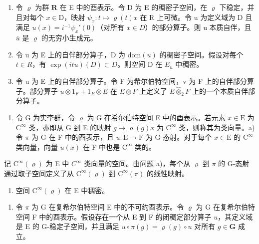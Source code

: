 \begin{enumerate}
\def\labelenumi{\alph{enumi})}
\item
  令 \(\varrho\) 为群 \(\mathbf{R}\) 在 E 中的酉表示。令 D 为 E 的稠密子空间，在 \(\varrho\) 下稳定，并且对每个 \(x\in\mathrm{D}\)，映射 \(\psi_{x}:t\mapsto\varrho(t)x\) 在 R 上可微。令 u 为定义域为 D 且满足 \(u(x) = i^{-1}\psi_x'(0)\)（对所有 \(x \in D\)）的部分算子。则 u 本质自伴，且 \(\overline{u}\) 是 \(\varrho\) 的无穷小生成元。
\item
  令 u 为 E 上的自伴部分算子，D 为 \(\text{dom}(u)\) 的稠密子空间。假设对每个 \(t \in R\)，有 \(\exp(itu)(D) \subset D\)。则空间 D 在 \(E_{u}\) 中稠密。
\item
  令 u 为 E 上的自伴部分算子。令 F 为希尔伯特空间，v 为 F 上的自伴部分算子。部分算子 \(u \otimes 1_{F} + 1_{E} \otimes E\) 在 \(E \otimes F\) 上定义了 \(E \widehat{\otimes}_{2} F\) 上的一个本质自伴部分算子。
\end{enumerate}

\begin{enumerate}
\def\labelenumi{\arabic{enumi})}
\setcounter{enumi}{11}
\tightlist
\item
  令 G 为实李群，令 \(\varrho\) 为 G 在希尔伯特空间 E 中的酉表示。若元素 \(x \in \mathrm{E}\) 为 \(\mathrm{C}^{\infty}\) 类，亦即从 G 到 E 的映射 \(g \mapsto \varrho(g)x\) 为 \(\mathrm{C}^{\infty}\) 类，则称其为类向量。a) 令 \(\pi\) 为 G 在 F 中的酉表示，且 \(u: \mathrm{E} \to \mathrm{F}\) 为 G-态射。对于每个 \(x \in \mathrm{E}\) 的 \(\mathrm{C}^{\infty}\) 类向量，向量 \(u(x)\) 在 F 中也是 \(\mathrm{C}^{\infty}\) 类的。
\end{enumerate}

记 \(\mathrm{C}^{\infty}(\varrho)\) 为 E 中 \(C^{\infty}\) 类向量的空间。由问题 a)，每个从 \(\varrho\) 到 \(\pi\) 的 G-态射通过取子空间定义了从 \(\mathrm{C}^{\infty}(\varrho)\) 到 \(\mathrm{C}^{\infty}(\pi)\) 的线性映射。

\begin{enumerate}
\def\labelenumi{\alph{enumi})}
\setcounter{enumi}{1}
\tightlist
\item
  空间 \(\mathrm{C}^{\infty}(\varrho)\) 在 E 中稠密。
\end{enumerate}

\begin{enumerate}
\def\labelenumi{\arabic{enumi})}
\setcounter{enumi}{12}
\tightlist
\item
  令 \(\pi\) 为 G 在复希尔伯特空间 E 中的不可约酉表示。令 \(\varrho\) 为 G 在复希尔伯特空间 F 中的酉表示。假设存在一个从 E 到 F 的闭稠定部分算子 \(u\)，其定义域是 E 的 G-稳定子空间，并且满足 \(u \circ \pi(g) = \varrho(g) \circ u\) 对所有 \(g \in \mathbf{G}\) 成立。
\end{enumerate}

